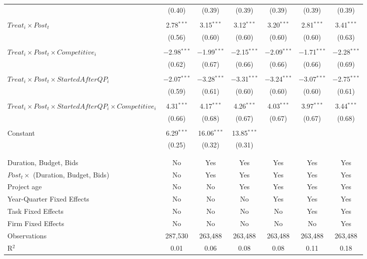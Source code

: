 \documentclass[
]{article}
\begin{document}
\begin{table}[H]
\begin{tabular}{@{\extracolsep{-3pt}}lcccccc}
  & (0.40) & (0.39) & (0.39) & (0.39) & (0.39) & (0.39) \\ 
  & & & & & & \\ 
 $Treat_i \times Post_t$ & 2.78$^{***}$ & 3.15$^{***}$ & 3.12$^{***}$ & 3.20$^{***}$ & 2.81$^{***}$ & 3.41$^{***}$ \\ 
  & (0.56) & (0.60) & (0.60) & (0.60) & (0.60) & (0.63) \\ 
  & & & & & & \\ 
 $Treat_i \times Post_t \times Competitive_i$ & $-$2.98$^{***}$ & $-$1.99$^{***}$ & $-$2.15$^{***}$ & $-$2.09$^{***}$ & $-$1.71$^{***}$ & $-$2.28$^{***}$ \\ 
  & (0.62) & (0.67) & (0.66) & (0.66) & (0.66) & (0.69) \\ 
  & & & & & & \\ 
 $Treat_i \times Post_t \times StartedAfterQP_i$ & $-$2.07$^{***}$ & $-$3.28$^{***}$ & $-$3.31$^{***}$ & $-$3.24$^{***}$ & $-$3.07$^{***}$ & $-$2.75$^{***}$ \\ 
  & (0.59) & (0.61) & (0.60) & (0.60) & (0.60) & (0.61) \\ 
  & & & & & & \\ 
 $Treat_i \times Post_t \times StartedAfterQP_i \times Competitive_i$ & 4.31$^{***}$ & 4.17$^{***}$ & 4.26$^{***}$ & 4.03$^{***}$ & 3.97$^{***}$ & 3.44$^{***}$ \\ 
  & (0.66) & (0.68) & (0.67) & (0.67) & (0.67) & (0.68) \\ 
  & & & & & & \\ 
 Constant & 6.29$^{***}$ & 16.06$^{***}$ & 13.85$^{***}$ &  &  &  \\ 
  & (0.25) & (0.32) & (0.31) &  &  &  \\ 
  & & & & & & \\ 
\hline \\[-1.8ex] 
Duration, Budget, Bids & No & Yes & Yes & Yes & Yes & Yes \\ 
$Post_t \times $  (Duration, Budget, Bids) & No & Yes & Yes & Yes & Yes & Yes \\ 
Project age & No & No & Yes & Yes & Yes & Yes \\ 
Year-Quarter Fixed Effects & No & No & No & Yes & Yes & Yes \\ 
Task Fixed Effects & No & No & No & No & Yes & Yes \\ 
Firm Fixed Effects & No & No & No & No & No & Yes \\ 
Observations & 287,530 & 263,488 & 263,488 & 263,488 & 263,488 & 263,488 \\ 
R$^{2}$ & 0.01 & 0.06 & 0.08 & 0.08 & 0.11 & 0.18 \\ 

\end{tabular}
\end{table}
\end{document}
